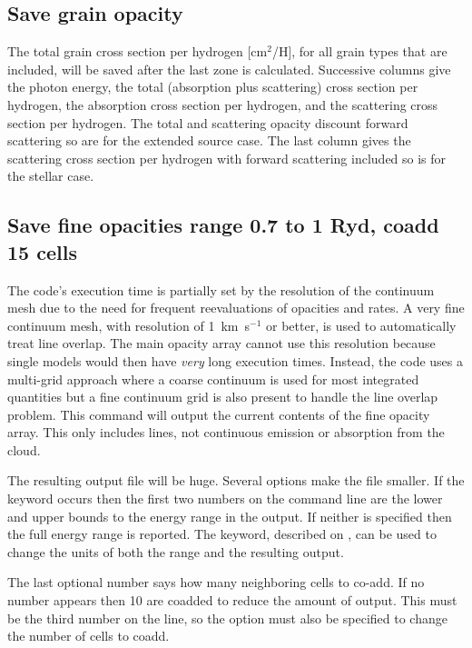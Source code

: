\subsection{Save grain opacity}

The total grain cross section per hydrogen [cm$^2$/H],
for all grain types that are included, will be
saved after the last zone is calculated.  Successive columns give the
photon energy, the total (absorption plus scattering) cross section per hydrogen, 
the absorption cross section per hydrogen, and the scattering cross section per hydrogen.  The total and scattering opacity
discount forward scattering so are for the extended source case.  The last
column gives the scattering cross section per hydrogen with forward scattering included so
is for the stellar case.

\subsection{Save fine opacities range 0.7 to 1 Ryd, coadd 15 cells}

The code's execution time is partially set by the resolution of the
continuum mesh due to the need for frequent reevaluations of opacities and
rates.
A very fine continuum mesh, with resolution of 1~km~s$^{-1}$ or better,
is used to automatically treat line overlap.
The main opacity array cannot
use this resolution because single models would then have \emph{very} long execution
times.
Instead, the code uses a multi-grid approach where a coarse continuum
is used for most integrated quantities but a fine continuum grid is also
present to handle the line overlap problem.  This command will output the
current contents of the fine opacity array.  This only includes lines, not
continuous
emission or absorption from the cloud.

The resulting output file
will be huge.  Several options make the file smaller.
If the keyword  occurs then the first two numbers on
the command line are the lower and upper bounds to the energy range in the
output.  If neither is specified then the full energy range is reported.
The  keyword, described on \pageref{output_units},
can be used to change the units of both the range and the resulting output.

The last optional number says how many neighboring cells to co-add.  If
no number appears then 10 are coadded to reduce the amount of output.
This must be the third number on the line, so the  option
must also be specified to change the number of cells to coadd.

